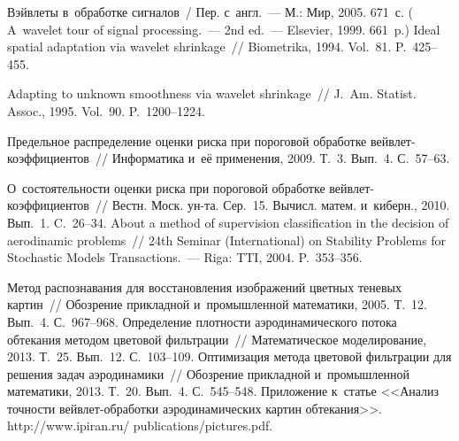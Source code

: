 \begin{multicols}{2}
{{\begin{thebibliography}{99}
    Вэйвлеты в~обработке сигналов~/ Пер. с~англ.~--- М.: Мир, 2005. 671~с.
    ( A~wavelet tour of signal processing.~--- 2nd ed.~---
    Elsevier, 1999. 661~p.)
 Ideal spatial adaptation via wavelet shrinkage~// 
Biometrika, 1994. Vol.~81. P.~425--455.
    
Adapting to unknown smoothness via wavelet shrinkage~// J.~Am. Statist. Assoc., 1995. Vol.~90. P.~1200--1224.


 Предельное распределение оценки риска при пороговой обработке 
вей\-в\-лет-ко\-эф\-фи\-ци\-ен\-тов~// Информатика и~её применения, 2009. Т.~3. Вып.~4. С.~57--63.

О~состоятельности оценки риска при пороговой обработке 
вей\-в\-лет-ко\-эф\-фи\-ци\-ен\-тов~// Вестн. Моск. ун-та. Сер.~15. 
Вычисл. матем. и~киберн., 2010. Вып.~1. C.~26--34.
    About a method of supervision classification in the decision of aerodinamic 
    problems~// 24th Seminar (International)
    on Stability Problems for Stochastic Models Transactions.~--- Riga: TTI, 2004. P.~353--356.
    
     Метод распознавания для восстановления изображений 
    цветных теневых картин~// Обозрение прикладной и~промышленной математики, 2005. 
    Т.~12. Вып.~4. С.~967--968.
    Определение плот\-ности аэродинамического потока обтекания методом цветовой 
    фильтрации~// Математическое моделирование, 2013. Т.~25. Вып.~12. С.~103--109.
    Оптимизация метода цветовой фильтрации для решения задач аэродинамики~// 
    Обозрение прикладной и~промышленной математики, 2013. Т.~20. Вып.~4. С.~545--548.
    Приложение \mbox{к~статье} <<Анализ точности вей\-в\-лет-об\-ра\-бот\-ки 
    аэродинамических картин обтекания>>. 
    {\sf http://www.ipiran.ru/ \mbox{publications/pictures.pdf}}.
\end{thebibliography}

 }
 }

\end{multicols}

\vspace*{-6pt}

